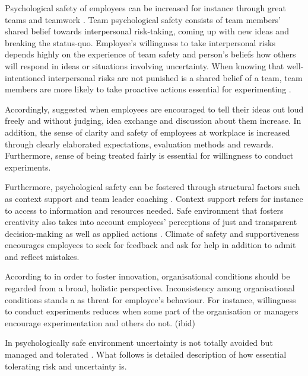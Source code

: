 Psychological safety of employees can be increased for instance through great teams and teamwork \citep{edmondson1999psychological}. Team psychological safety consists of team members' shared belief towards interpersonal risk-taking, coming up with new ideas and breaking the status-quo. Employee's willingness to take interpersonal risks depends highly on the experience of team safety and person's beliefs how others will respond in ideas or situations involving uncertainty. \citep{edmondson1999psychologica,farson2002failuretolerantleaderl} When knowing that well-intentioned interpersonal risks are not punished is a shared belief of a team, team members are more likely to take proactive actions essential for experimenting \citep{garvin2008yours}.

Accordingly, \citet{amabile1998kill} suggested when employees are encouraged to tell their ideas out loud freely and without judging, idea exchange and discussion about them increase. In addition, the sense of clarity and safety of employees at workplace is increased through clearly elaborated expectations, evaluation methods and rewards. Furthermore, sense of being treated fairly is essential for willingness to conduct experiments. \citep{shalley2004leaders}

Furthermore, psychological safety can be fostered through structural factors such as context support and team leader coaching \citep{hackman1987design,edmondson1999psychological}. Context support refers for instance to access to information and resources needed. Safe environment that fosters creativity also takes into account employees' perceptions of just and transparent decision-making as well as applied actions \citep{shalley2004leaders}. Climate of safety and supportiveness encourages employees to seek for feedback and ask for help in addition to admit and reflect mistakes. \citep{edmondson1999psychological} 

According to \citet{lee2004mixed} in order to foster innovation, organisational conditions should be regarded from a broad, holistic perspective. Inconsistency among organisational conditions stands a as threat for employee's behaviour. For instance, willingness to conduct experiments reduces when some part of the organisation or managers encourage experimentation and others do not. (ibid)

In psychologically safe environment uncertainty is not totally avoided but managed and tolerated \citep{shalley2004leaders}. What follows is detailed description of how essential tolerating risk and uncertainty is. 


